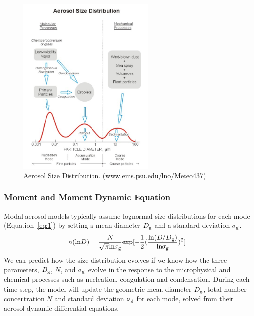 \documentclass[12pt, fullpage]{uiucthesis2009}
\begin{document}
		\begin{figure}[h] 
			\begin{center}
				\includegraphics[width = 0.6\textwidth]{Figure04}
				\caption[Aerosol Size Distribution. (www.ems.psu.edu/\~lno/Meteo437]{\label{fig_P4} Aerosol Size Distribution. (www.ems.psu.edu/\~lno/Meteo437)}
			\end{center}
		\end{figure}
		\subsubsection{Moment and Moment Dynamic Equation}
		Modal aerosol models typically assume lognormal size distributions for each mode (Equation~\ref{eq:1}) by setting a mean diameter $D_{\rm g}$ and a standard deviation $\sigma_{\rm g}$. 
		\begin{align}\label{eq:1}
		n(\text{ln}D) = \frac{N}{\sqrt{\pi}\text{ln}\sigma_{\rm g}}\text{exp}[-\frac{1}{2}(\frac{\text{ln}(D/D_{\rm g})}{\text{ln}\sigma_{\rm g}})^2]
		\end{align}
		We can predict how the size distribution evolves if we know how the three parameters, $D_{\rm g}$, $N$, and $\sigma_{\rm g}$ evolve in the response to the microphysical and chemical processes such as nucleation, coagulation and condensation. During each time step, the model will update the geometric mean diameter $D_{\rm g}$, total number concentration $N$ and standard deviation $\sigma_{\rm g}$ for each mode, solved from their aerosol dynamic differential equations. 
		
\end{document}
